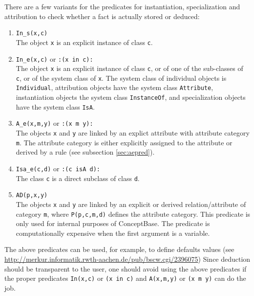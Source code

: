 There are a few variants for the predicates for instantiation, specialization and attribution 
to check whether a fact is actually stored or deduced: 

\begin{enumerate}
\item {\tt In\_s(x,c)}\\
The object {\tt x} is an explicit instance of class {\tt c}.
\item {\tt In\_e(x,c)} or {\tt :(x in c):}\\
The object {\tt x} is an explicit instance of class {\tt c}, or of one of the
 sub-classes of {\tt c}, or of the system class of {\tt x}. The system class of
individual objects is {\tt Individual}, attribution objects  have the system class {\tt Attribute},
instantiation objects the system class {\tt InstanceOf}, and specialization objects have the system
class {\tt IsA}.
\item {\tt A\_e(x,m,y)} or {\tt :(x m y):}\\
The objects {\tt x} and {\tt y} are linked by an explict attribute with attribute category {\tt m}.
The attribute category is either explicitly assigned to the attribute or derived by a rule (see 
subsection \ref{sec:aepred}).
\item {\tt Isa\_e(c,d)} or {\tt :(c isA d):}\\
The class {\tt c} is a direct subclass of class {\tt d}.
\item {\tt AD(p,x,y)}\\
The objects {\tt x} and {\tt y} are linked by an explicit or derived relation/attribute
of category {\tt m}, where {\tt P(p,c,m,d)} defines the attribute category. This predicate
is only used for internal purposes of ConceptBase. The predicate is computationally expensive
when the first argument is a variable.
\end{enumerate}

The above predicates can be used, for example,
to define defaults values (see
\url{http://merkur.informatik.rwth-aachen.de/pub/bscw.cgi/2396075})
Since deduction should be transparent to the user,
one should avoid using the above predicates if the proper predicates {\tt In(x,c)} or {\tt (x in c)} and
{\tt A(x,m,y)} or {\tt (x m y)} can do the job.




